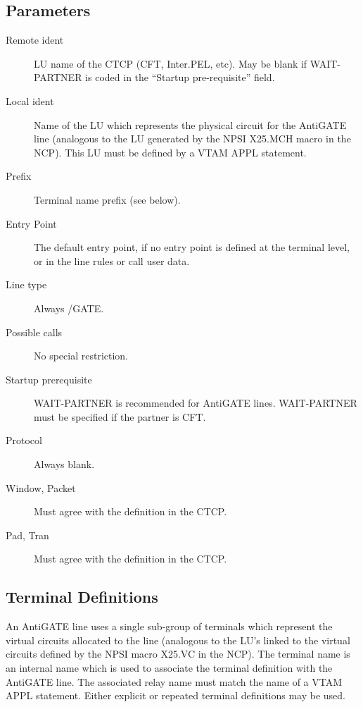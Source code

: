 \documentclass[letterpaper,10pt,english]{sphinxmanual}
\begin{document}
\subsection{Parameters}
\label{\detokenize{connectivity_guide:index-75}}\label{\detokenize{connectivity_guide:id34}}\begin{description}
\item[{Remote ident}] \leavevmode
LU name of the CTCP (CFT, Inter.PEL, etc). May be blank if WAIT-PARTNER is coded in the “Startup pre-requisite” field.

\item[{Local ident}] \leavevmode
Name of the LU which represents the physical circuit for the AntiGATE line (analogous to the LU generated by the NPSI X25.MCH
macro in the NCP). This LU must be defined by a VTAM APPL statement.

\item[{Prefix}] \leavevmode
Terminal name prefix (see below).

\item[{Entry Point}] \leavevmode
The default entry point, if no entry point is defined at the terminal level, or in the line rules or call user data.

\item[{Line type}] \leavevmode
Always /GATE.

\item[{Possible calls}] \leavevmode
No special restriction.

\item[{Startup prerequisite}] \leavevmode
WAIT-PARTNER is recommended for AntiGATE lines. WAIT-PARTNER must be specified if the partner is CFT.

\item[{Protocol}] \leavevmode
Always blank.

\item[{Window, Packet}] \leavevmode
Must agree with the definition in the CTCP.

\item[{Pad, Tran}] \leavevmode
Must agree with the definition in the CTCP.

\end{description}

\ignorespaces 

\subsection{Terminal Definitions}
\label{\detokenize{connectivity_guide:index-76}}\label{\detokenize{connectivity_guide:id35}}
An AntiGATE line uses a single sub-group of terminals which represent the virtual circuits allocated to the line (analogous to the LU’s linked to the virtual circuits defined by the NPSI macro X25.VC in the NCP). The terminal name is an internal name which is used to associate the terminal definition with the AntiGATE line. The associated relay name must match the name of a VTAM APPL statement. Either explicit or repeated terminal definitions may be used.
\end{document}
